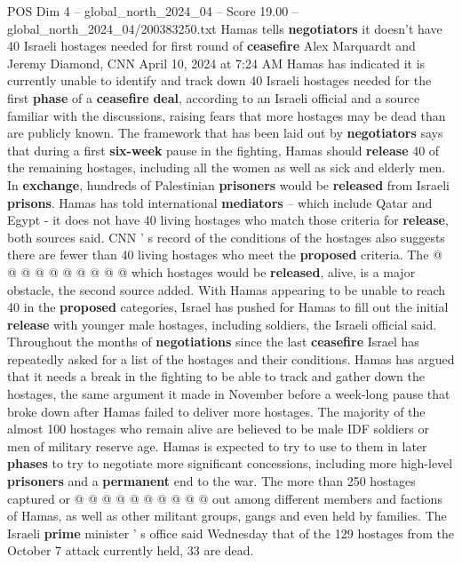 \begin{textsample}{POS Dim 4 – global\_north\_2024\_04 – Score 19.00 – global\_north\_2024\_04/200383250.txt}  \label{ex:f4_pos_367}
Hamas tells \textbf{negotiators} it doesn't have 40 Israeli hostages needed for first round of \textbf{ceasefire} Alex Marquardt and Jeremy Diamond, CNN April 10, 2024 at 7:24 AM Hamas has indicated it is currently unable to identify and track down 40 Israeli hostages needed for the first \textbf{phase} of a \textbf{ceasefire} \textbf{deal}, according to an Israeli official and a source familiar with the discussions, raising fears that more hostages may be dead than are publicly known.
The framework that has been laid out by \textbf{negotiators} says that during a first \textbf{six-week} pause in the fighting, Hamas should \textbf{release} 40 of the remaining hostages, including all the women as well as sick and elderly men.
In \textbf{exchange}, hundreds of Palestinian \textbf{prisoners} would be \textbf{released} from Israeli \textbf{prisons}.
Hamas has told international \textbf{mediators} -- which include Qatar and Egypt - it does not have 40 living hostages who match those criteria for \textbf{release}, both sources said.
CNN ' s record of the conditions of the hostages also suggests there are fewer than 40 living hostages who meet the \textbf{proposed} criteria.
The @ @ @ @ @ @ @ @ @ @ which hostages would be \textbf{released}, alive, is a major obstacle, the second source added.
With Hamas appearing to be unable to reach 40 in the \textbf{proposed} categories, Israel has pushed for Hamas to fill out the initial \textbf{release} with younger male hostages, including soldiers, the Israeli official said.
Throughout the months of \textbf{negotiations} since the last \textbf{ceasefire} Israel has repeatedly asked for a list of the hostages and their conditions.
Hamas has argued that it needs a break in the fighting to be able to track and gather down the hostages, the same argument it made in November before a week-long pause that broke down after Hamas failed to deliver more hostages.
The majority of the almost 100 hostages who remain alive are believed to be male IDF soldiers or men of military reserve age.
Hamas is expected to try to use to them in later \textbf{phases} to try to negotiate more significant concessions, including more high-level \textbf{prisoners} and a \textbf{permanent} end to the war.
The more than 250 hostages captured or @ @ @ @ @ @ @ @ @ @ out among different members and factions of Hamas, as well as other militant groups, gangs and even held by families.
The Israeli \textbf{prime} minister ' s office said Wednesday that of the 129 hostages from the October 7 attack currently held, 33 are dead.

\end{textsample}
